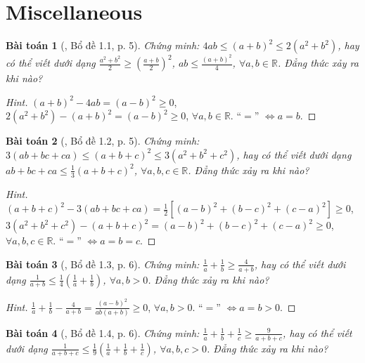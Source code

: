 \documentclass{article}
\newtheorem{baitoan}{Bài toán}
\begin{document}

\section{Miscellaneous}

\begin{baitoan}[\cite{Son_Nghiep_Trung_Can2021}, Bổ đề 1.1, p. 5]
	Chứng minh: $4ab\le(a + b)^2\le2(a^2 + b^2)$, hay có thể viết dưới dạng $\frac{a^2 + b^2}{2}\ge\left(\frac{a + b}{2}\right)^2$, $ab\le\frac{(a + b)^2}{4}$, $\forall a,b\in\mathbb{R}$. Đẳng thức xảy ra khi nào?
\end{baitoan}

\begin{proof}[Hint]
	$(a + b)^2 - 4ab = (a - b)^2\ge 0$, $2(a^2 + b^2) - (a + b)^2 = (a - b)^2\ge 0$, $\forall a,b\in\mathbb{R}$. ``$=$'' $\Leftrightarrow a = b$.
\end{proof}

\begin{baitoan}[\cite{Son_Nghiep_Trung_Can2021}, Bổ đề 1.2, p. 5]
	Chứng minh: $3(ab + bc + ca)\le(a + b + c)^2\le3(a^2 + b^2 + c^2)$, hay có thể viết dưới dạng $ab + bc + ca\le\frac{1}{3}(a + b + c)^2$, $\forall a,b,c\in\mathbb{R}$. Đẳng thức xảy ra khi nào?
\end{baitoan}

\begin{proof}[Hint]
	$(a + b + c)^2 - 3(ab + bc + ca) = \frac{1}{2}\left[(a - b)^2 + (b - c)^2 + (c - a)^2\right]\ge 0$, $3(a^2 + b^2 + c^2) - (a + b + c)^2 = (a - b)^2 + (b - c)^2 + (c - a)^2\ge 0$, $\forall a,b,c\in\mathbb{R}$. ``$=$'' $\Leftrightarrow a = b = c$.
\end{proof}

\begin{baitoan}[\cite{Son_Nghiep_Trung_Can2021}, Bổ đề 1.3, p. 6]
	Chứng minh: $\frac{1}{a} + \frac{1}{b}\ge\frac{4}{a + b}$, hay có thể viết dưới dạng $\frac{1}{a + b}\le\frac{1}{4}\left(\frac{1}{a} + \frac{1}{b}\right)$, $\forall a,b > 0$. Đẳng thức xảy ra khi nào?
\end{baitoan}

\begin{proof}[Hint]
	$\frac{1}{a} + \frac{1}{b} - \frac{4}{a + b} = \frac{(a - b)^2}{ab(a + b)}\ge 0$, $\forall a,b > 0$. ``$=$'' $\Leftrightarrow a = b > 0$.
\end{proof}

\begin{baitoan}[\cite{Son_Nghiep_Trung_Can2021}, Bổ đề 1.4, p. 6]
	Chứng minh: $\frac{1}{a} + \frac{1}{b} + \frac{1}{c}\ge\frac{9}{a + b + c}$, hay có thể viết dưới dạng $\frac{1}{a + b + c}\le\frac{1}{9}\left(\frac{1}{a} + \frac{1}{b} + \frac{1}{c}\right)$, $\forall a,b,c > 0$. Đẳng thức xảy ra khi nào?
\end{baitoan}
\end{document}
